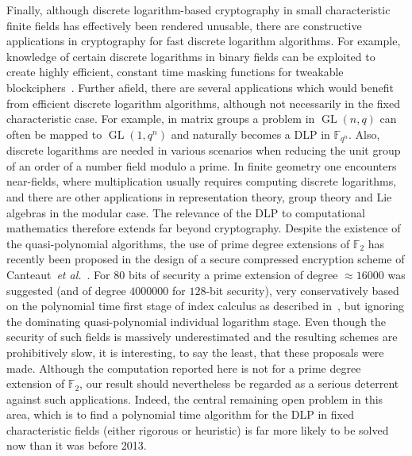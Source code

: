 \documentclass[11pt]{llncs}
\newcommand{\F}{\mathbb F}
\newcommand{\ea}{\emph{et al.}}
\DeclareMathOperator{\GL}{GL}
\begin{document}
Finally, although discrete logarithm-based cryptography in small characteristic finite fields has effectively been rendered unusable, there are
constructive applications in cryptography for fast discrete logarithm algorithms. For example, knowledge of certain discrete logarithms in binary 
fields can be exploited to create highly efficient, constant time masking functions for tweakable blockciphers~\cite{GJMN16}. Further afield, there 
are several applications which would benefit from efficient discrete logarithm algorithms, although not necessarily in the fixed 
characteristic case. For example, in matrix groups a problem in $\GL(n, q)$ can often be mapped to $\GL(1, q^n)$ and naturally becomes a DLP in 
$\F_{q^n}$.
Also, discrete logarithms are needed in various scenarios when reducing the unit group of an order of a number field modulo a prime. In finite geometry 
one encounters near-fields, where multiplication usually requires computing discrete logarithms, and there are other applications 
in representation theory, group theory and Lie algebras in the modular case. The relevance of the DLP to computational mathematics therefore extends 
far beyond cryptography. Despite the existence of the quasi-polynomial algorithms, the use of prime degree extensions of $\F_2$ has recently been 
proposed in the design of a secure compressed encryption scheme of Canteaut~\ea~\cite[Sec.~5]{Canteaut}. 
For $80$ bits of security a prime extension of degree $\approx \num{16000}$ was suggested (and of degree 
$\num{4000000}$ for $128$-bit security), very conservatively based on the polynomial time first 
stage of index calculus as described in~\cite{JP14}, but ignoring the dominating quasi-polynomial individual logarithm stage. Even though the security of 
such fields is massively underestimated and the resulting schemes are prohibitively slow, it is interesting, to say the least, that these proposals were 
made. Although the computation reported here is not for a prime degree extension of $\F_2$, our result should nevertheless be regarded as a serious 
deterrent against such applications. Indeed, the central remaining open problem in this area, which is to find a polynomial time algorithm for the DLP in fixed characteristic fields (either rigorous or heuristic) is far more likely to be solved now than it was before 2013.
 
\end{document}
